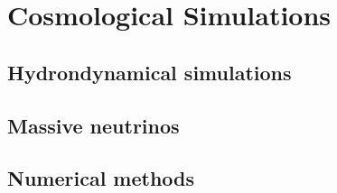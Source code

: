 \chapter{Cosmological Simulations}

\section{Hydrondynamical simulations}

\section{Massive neutrinos}

\section{Numerical methods}